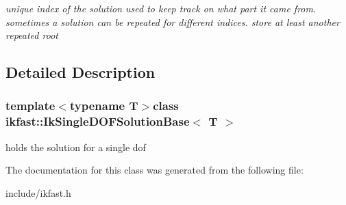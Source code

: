 \begin{DoxyCompactItemize}
\begin{DoxyCompactList}\small\item\em unique index of the solution used to keep track on what part it came from. sometimes a solution can be repeated for different indices. store at least another repeated root \end{DoxyCompactList}\end{DoxyCompactItemize}


\subsection{Detailed Description}
\subsubsection*{template$<$typename T$>$class ikfast\-::\-Ik\-Single\-D\-O\-F\-Solution\-Base$<$ T $>$}

holds the solution for a single dof 

The documentation for this class was generated from the following file\-:\begin{DoxyCompactItemize}
\item 
include/ikfast.\-h\end{DoxyCompactItemize}
